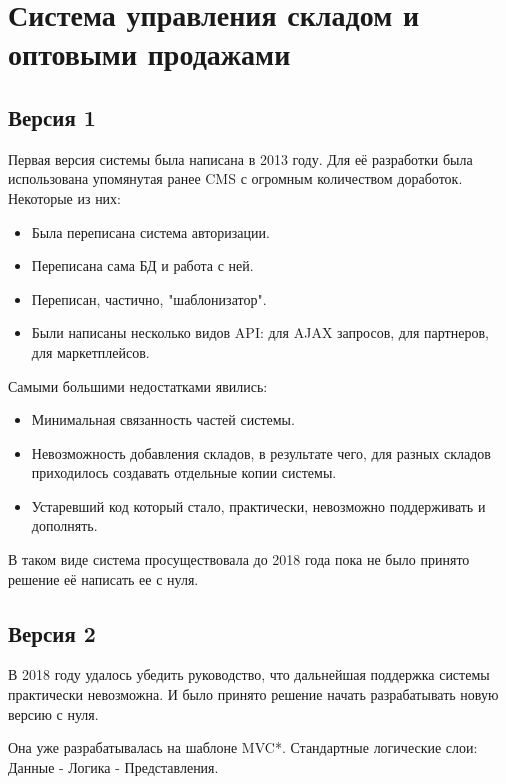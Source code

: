 \documentclass[10pt]{tpl/developercv} %
\begin{document}
\section{Система управления складом и оптовыми продажами}
\subsection{Версия 1}

Первая версия системы была написана в 2013 году. Для её разработки была использована упомянутая ранее CMS с огромным количеством доработок. Некоторые из них:
\begin{itemize}
  \item Была переписана система авторизации.
  \item Переписана сама БД и работа с ней.
  \item Переписан, частично, "шаблонизатор".
  \item Были написаны несколько видов API: для AJAX запросов, для партнеров, для маркетплейсов.
\end{itemize}

Самыми большими недостатками явились:
\begin{itemize}
  \item Минимальная связанность частей системы.
  \item Невозможность добавления складов, в результате чего, для разных складов приходилось создавать отдельные копии системы.
  \item Устаревший код который стало, практически, невозможно поддерживать и дополнять.
\end{itemize}

В таком виде система просуществовала до 2018 года пока не было принято решение её написать ее с нуля.

\subsection{Версия 2}
В 2018 году удалось убедить руководство, что дальнейшая поддержка системы практически невозможна. И было принято решение начать разрабатывать новую версию с нуля.

Она уже разрабатывалась на шаблоне MVC*. Стандартные логические слои: Данные - Логика - Представления.
\paragraph{}
\end{document}
